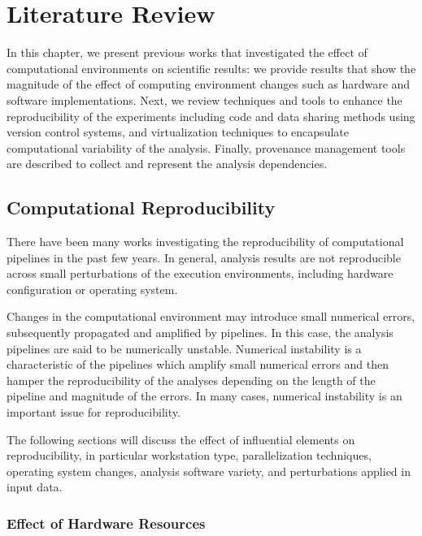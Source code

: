 \chapter{Literature Review}
\label{ch:background}

In this chapter, we present previous works that investigated the effect of 
computational environments on scientific results: we provide results 
that show the magnitude of the effect of computing environment changes such 
as hardware and software implementations. Next, we review 
techniques and tools to enhance the reproducibility of the experiments 
including code and data sharing methods using version control 
systems, and virtualization techniques to encapsulate computational 
variability of the analysis. 
Finally, provenance management tools are described 
to collect and represent the analysis dependencies. 


\section{Computational Reproducibility}

There have been many works investigating the reproducibility of
computational pipelines in the past few years. In general, analysis 
results are not reproducible across small perturbations of the 
execution environments, including hardware configuration or operating 
system. 

Changes in the computational environment may introduce small numerical 
errors, subsequently propagated and amplified by pipelines. In this 
case, the analysis pipelines are said to be numerically unstable. 
Numerical instability is a characteristic of the pipelines which 
amplify small numerical errors and then hamper the reproducibility 
of the analyses depending on the length of the pipeline and magnitude 
of the errors. In many cases, numerical instability is an important 
issue for reproducibility. 

The following sections will discuss the effect of influential elements on 
reproducibility, in particular workstation type, parallelization techniques, 
operating system changes, analysis software variety, and perturbations 
applied in input data. 

\subsection{Effect of Hardware Resources}

